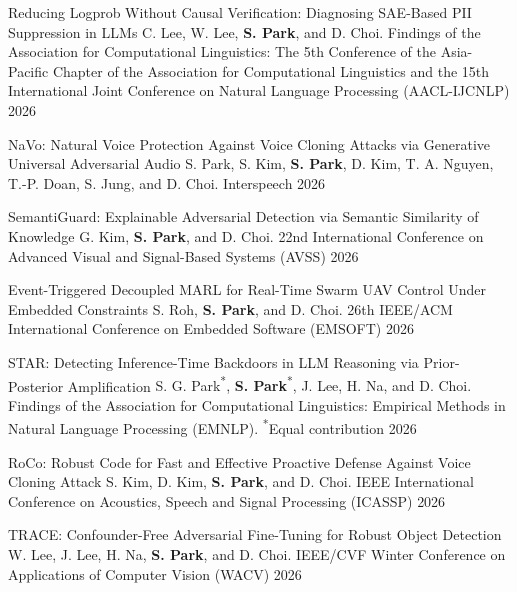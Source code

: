 
\begin{cvhonors}
  \cvhonor
    {Reducing Logprob Without Causal Verification: Diagnosing SAE-Based PII Suppression in LLMs}
    {C. Lee, W. Lee, \textbf{S. Park}, and D. Choi. Findings of the Association for Computational Linguistics: The 5th Conference of the Asia-Pacific Chapter of the Association for Computational Linguistics and the 15th International Joint Conference on Natural Language Processing (AACL-IJCNLP)}
    {}
    {2026}

  \cvhonor
    {NaVo: Natural Voice Protection Against Voice Cloning Attacks via Generative Universal Adversarial Audio}
    {S. Park, S. Kim, \textbf{S. Park}, D. Kim, T. A. Nguyen, T.-P. Doan, S. Jung, and D. Choi. Interspeech}
    {}
    {2026}

  \cvhonor
    {SemantiGuard: Explainable Adversarial Detection via Semantic Similarity of Knowledge}
    {G. Kim, \textbf{S. Park}, and D. Choi. 22nd International Conference on Advanced Visual and Signal-Based Systems (AVSS)}
    {}
    {2026}

  \cvhonor
    {Event-Triggered Decoupled MARL for Real-Time Swarm UAV Control Under Embedded Constraints}
    {S. Roh, \textbf{S. Park}, and D. Choi. 26th IEEE/ACM International Conference on Embedded Software (EMSOFT)}
    {}
    {2026}

  \cvhonor
    {STAR: Detecting Inference-Time Backdoors in LLM Reasoning via Prior-Posterior Amplification}
    {S. G. Park\textsuperscript{*}, \textbf{S. Park}\textsuperscript{*}, J. Lee, H. Na, and D. Choi. Findings of the Association for Computational Linguistics: Empirical Methods in Natural Language Processing (EMNLP). \textsuperscript{*}Equal contribution}
    {}
    {2026}

  \cvhonor
    {RoCo: Robust Code for Fast and Effective Proactive Defense Against Voice Cloning Attack}
    {S. Kim, D. Kim, \textbf{S. Park}, and D. Choi. IEEE International Conference on Acoustics, Speech and Signal Processing (ICASSP)}
    {}
    {2026}

  \cvhonor
    {TRACE: Confounder-Free Adversarial Fine-Tuning for Robust Object Detection}
    {W. Lee, J. Lee, H. Na, \textbf{S. Park}, and D. Choi. IEEE/CVF Winter Conference on Applications of Computer Vision (WACV)}
    {}
    {2026}


\end{cvhonors}
